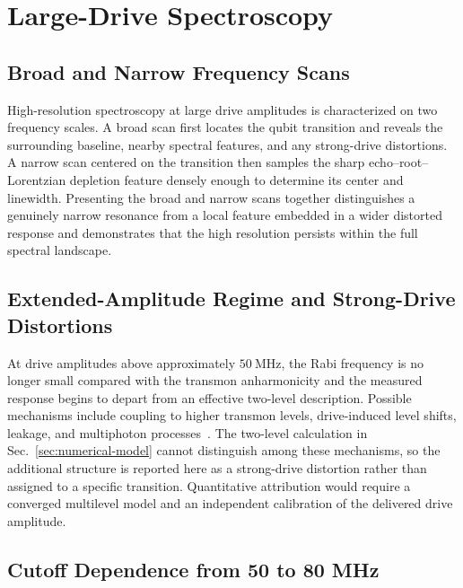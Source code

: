 \FloatBarrier
\section{Large-Drive Spectroscopy}
\label{sec:high-amplitude-regime}

\subsection{Broad and Narrow Frequency Scans}
\label{subsec:broad-and-narrow-scans}

High-resolution spectroscopy at large drive amplitudes is characterized on two
frequency scales.  A broad scan first locates the qubit transition and reveals
the surrounding baseline, nearby spectral features, and any strong-drive
distortions.  A narrow scan centered on the transition then samples the sharp
echo--root--Lorentzian depletion feature densely enough to determine its center
and linewidth.  Presenting the broad and narrow scans together distinguishes a
genuinely narrow resonance from a local feature embedded in a wider distorted
response and demonstrates that the high resolution persists within the full
spectral landscape.

\subsection{Extended-Amplitude Regime and Strong-Drive Distortions}
\label{subsec:extended-amplitude-regime}

At drive amplitudes above approximately $50~\mathrm{MHz}$, the Rabi frequency
is no longer small compared with the transmon anharmonicity and the measured
response begins to depart from an effective two-level description.  Possible
mechanisms include coupling
to higher transmon levels, drive-induced level shifts, leakage, and
multiphoton processes~\cite{PhysRevA.76.042319,motzoi_drag_2009,tuorila_stark_2010}.  The two-level calculation in
Sec.~\ref{sec:numerical-model} cannot distinguish among these mechanisms, so
the additional structure is reported here as a strong-drive distortion rather
than assigned to a specific transition.  Quantitative attribution would
require a converged multilevel model and an independent calibration of the
delivered drive amplitude.

\subsection{Cutoff Dependence from 50 to 80 MHz}
\label{subsec:high-amplitude-cutoff-comparison}

